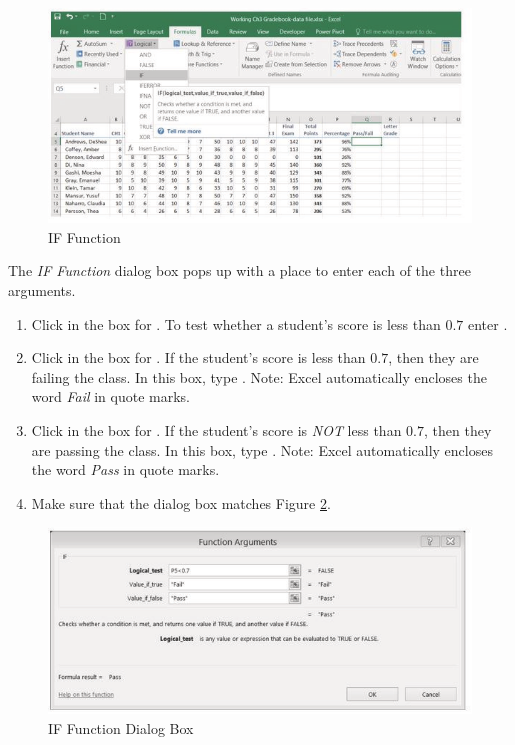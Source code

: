 \begin{figure}[H]
	\centering
	\includegraphics[width=\maxwidth{.95\linewidth}]{gfx/ch03_fig09}
	\caption{IF Function}
	\label{03:fig09}
\end{figure}

The \textit{IF Function} dialog box pops up with a place to enter each of the three arguments.

\begin{enumerate}
	\item Click in the box for . To test whether a student's score is less than $ 0.7 $ enter .
	\item Click in the box for . If the student's score is less than $ 0.7 $, then they are failing the class. In this box, type . Note: Excel automatically encloses the word \textit{Fail} in quote marks.
	\item Click in the box for . If the student's score is \textit{NOT} less than $ 0.7 $, then they are passing the class. In this box, type . Note: Excel automatically encloses the word \textit{Pass} in quote marks.
	\item Make sure that the dialog box matches Figure \ref{03:fig10}.
\end{enumerate}

\begin{figure}[H]
	\centering
	\includegraphics[width=\maxwidth{.95\linewidth}]{gfx/ch03_fig10}
	\caption{IF Function Dialog Box}
	\label{03:fig10}
\end{figure}

